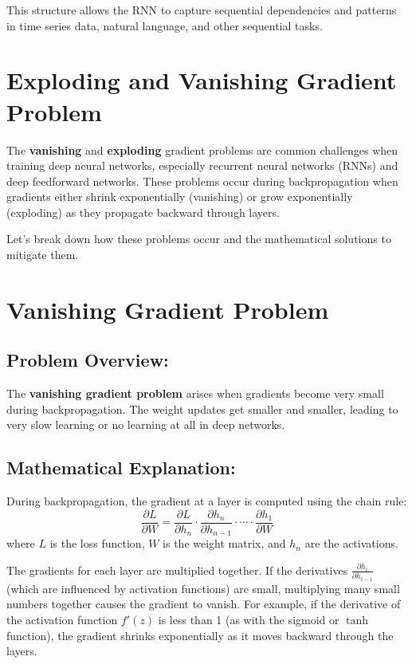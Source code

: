 \documentclass[10pt]{article}
\begin{document}
This structure allows the RNN to capture sequential dependencies and patterns in time series data, natural language, and other sequential tasks.


\section {Exploding and Vanishing Gradient Problem}


The {\bf vanishing} and {\bf exploding} gradient problems 
are common challenges when 
training deep neural networks, especially recurrent neural networks (RNNs) 
and deep feedforward networks. These problems occur during backpropagation 
when gradients either shrink exponentially (vanishing) or grow exponentially 
(exploding) as they propagate backward through layers.

Let’s break down how these problems occur and the mathematical solutions to mitigate them.

\section{ Vanishing Gradient Problem}

\subsection{ Problem Overview:}
The {\bf vanishing gradient problem} arises when gradients become very small during backpropagation. The weight updates get smaller and smaller, leading to very slow learning or no learning at all in deep networks.

\subsection{ Mathematical Explanation:}
During backpropagation, the gradient at a layer is computed using the chain rule:
\[
\frac{\partial L}{\partial W} = \frac{\partial L}{\partial h_n} \cdot \frac{\partial h_n}{\partial h_{n-1}} \cdot \cdots \cdot \frac{\partial h_1}{\partial W}
\]
where \(L\) is the loss function, \(W\) is the weight matrix, and \(h_n\) are the activations.

The gradients for each layer are multiplied together. If the derivatives \( \frac{\partial h_i}{\partial h_{i-1}} \) (which are influenced by activation functions) are small, multiplying many small numbers together causes the gradient to vanish. For example, if the derivative of the activation function \( f'(z) \) is less than 1 (as with the sigmoid or \( \tanh \) function), the gradient shrinks exponentially as it moves backward through the layers.
\end{document}
